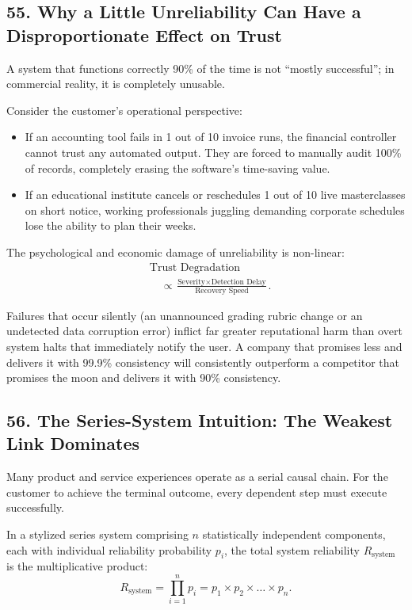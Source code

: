 \subsection*{55. Why a Little Unreliability Can Have a Disproportionate Effect on Trust}

A system that functions correctly 90\% of the time is not ``mostly successful''; in commercial reality, it is completely unusable.

Consider the customer's operational perspective:
\begin{itemize}
    \item If an accounting tool fails in 1 out of 10 invoice runs, the financial controller cannot trust any automated output. They are forced to manually audit 100\% of records, completely erasing the software's time-saving value.
    \item If an educational institute cancels or reschedules 1 out of 10 live masterclasses on short notice, working professionals juggling demanding corporate schedules lose the ability to plan their weeks.
\end{itemize}

The psychological and economic damage of unreliability is non-linear:
\begin{equation}
\begin{aligned}
&\text{Trust Degradation} \\
&\quad \propto \frac{\text{Severity} \times \text{Detection Delay}}{\text{Recovery Speed}}.
\end{aligned}
\end{equation}

Failures that occur silently (an unannounced grading rubric change or an undetected data corruption error) inflict far greater reputational harm than overt system halts that immediately notify the user. A company that promises less and delivers it with 99.9\% consistency will consistently outperform a competitor that promises the moon and delivers it with 90\% consistency.

\subsection*{56. The Series-System Intuition: The Weakest Link Dominates}

Many product and service experiences operate as a serial causal chain. For the customer to achieve the terminal outcome, every dependent step must execute successfully.

In a stylized series system comprising $n$ statistically independent components, each with individual reliability probability $p_i$, the total system reliability $R_{\text{system}}$ is the multiplicative product:
\begin{equation}
R_{\text{system}} = \prod_{i=1}^{n} p_i = p_1 \times p_2 \times \dots \times p_n.
\end{equation}

